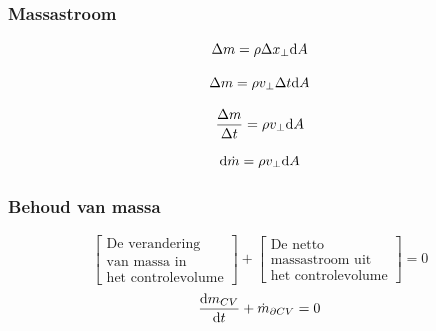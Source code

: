 \documentclass[t]{beamer}
\begin{document}
  		\begin{frame}
  			\frametitle{Massastroom}
  			\begin{equation*}
				\Delta m = \rho \Delta x_{\perp} \mathrm{d} A
			\end{equation*}
  			
  			\pause
  			\begin{equation*}
				\Delta m = \rho v_{\perp} \Delta t \mathrm{d} A
			\end{equation*}
			
			\pause
  			\begin{equation*}
				\frac{\Delta m}{\Delta t} = \rho v_{\perp} \mathrm{d} A
			\end{equation*}
			
			\pause
			\begin{equation}
				\mathrm{d} \dot{m}  = \rho v_{\perp} \mathrm{d} A
				\label{eqn:massastroom}
			\end{equation}
  		\end{frame}
		\begin{frame}
			\frametitle{Behoud van massa}
			\vspace{1cm}
			\begin{equation*}
				\left[
					\begin{array}{c}
						\mbox{De verandering} \\ \mbox{van massa in} \\ \mbox{het controlevolume}
					\end{array}
				\right]
				+
				\left[
					\begin{array}{c}
						\mbox{De netto} \\ \mbox{massastroom uit} \\ \mbox{het controlevolume}
					\end{array}
				\right]
				= 0
				\label{eqn:controlevolume,behoud van massa,woorden}
			\end{equation*}
			\vspace{1cm}
			\pause
			\begin{equation}
				\frac{\mathrm{d} m_{CV}}{\mathrm{d} t} + \dot{m}_{\partial CV} = 0
				\label{eqn:controlevolume,behoud van massa}
			\end{equation}
		\end{frame}	
\end{document}
